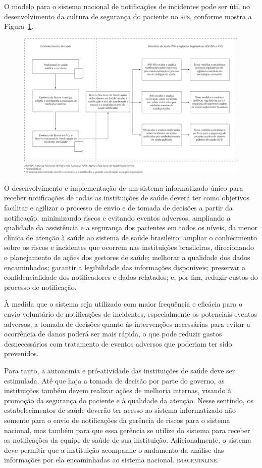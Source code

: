 \documentclass{article}
\begin{document}
O modelo para o sistema nacional de notificações de incidentes pode ser útil no
desenvolvimento da cultura de segurança do paciente no \textsc{sus}, conforme mostra a
Figura~\ref{fig:f01}.

\begin{figure}
\includegraphics[width=\textwidth]{0034-8910-rsp-47-04-0791-gf01}
\caption{}\label{fig:f01}
\end{figure}

O desenvolvimento e implementação de um sistema informatizado único para receber
notificações de todas as instituições de saúde deverá ter como objetivos
facilitar e
agilizar o processo de envio e de tomada de decisões a partir da notificação,
minimizando
riscos e evitando eventos adversos, ampliando a qualidade da assistência e a
segurança dos
pacientes em todos os níveis, da menor clínica de atenção à saúde ao sistema de
saúde
brasileiro; ampliar o conhecimento sobre os riscos e incidentes que ocorrem nas
instituições
brasileiras, direcionando o planejamento de ações dos gestores de saúde;
melhorar a
qualidade dos dados encaminhados; garantir a legibilidade das informações
disponíveis;
preservar a confidencialidade dos notificadores e dados relatados; e, por fim,
reduzir
custos do processo de notificação.

À medida que o sistema seja utilizado com maior frequência e eficácia para o
envio
voluntário de notificações de incidentes, especialmente os potenciais eventos
adversos, a
tomada de decisões quanto às intervenções necessárias para evitar a ocorrência
de danos
poderá ser mais rápida, o que pode reduzir gastos desnecessários com tratamento
de eventos
adversos que poderiam ter sido prevenidos.

Para tanto, a autonomia e pró-atividade das instituições de saúde deve ser
estimulada. Até
que haja a tomada de decisão por parte do governo, as instituições também devem
realizar
ações de melhoria internas, visando à promoção da segurança do paciente e à
qualidade da
atenção. Nesse sentindo, os estabelecimentos de saúde deverão ter acesso ao
sistema
informatizado não somente para o envio de notificações da gerência de riscos
para o sistema
nacional, mas também para que essa gerência se utilize do sistema para receber
as
notificações da equipe de saúde de sua instituição. Adicionalmente, o sistema
deve permitir
que a instituição acompanhe o andamento da análise das informações por ela
encaminhadas ao
sistema nacional. \textsc{imageminline}.
\end{document}
